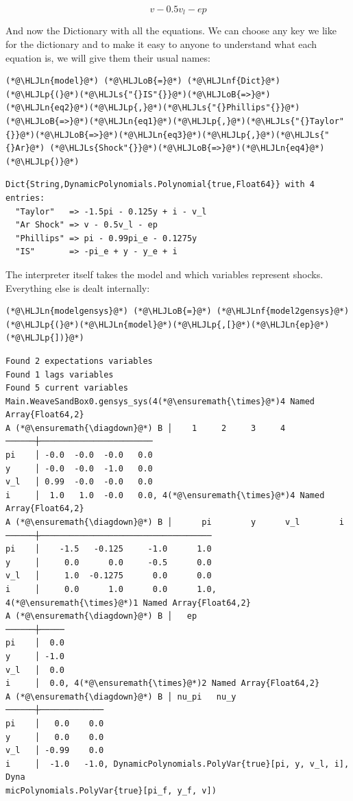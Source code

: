 \documentclass[12pt,a4paper]{article}
\newcommand{\HLJLn}[1]{#1}
\newcommand{\HLJLnf}[1]{\textcolor[RGB]{66,102,213}{#1}}
\newcommand{\HLJLs}[1]{\textcolor[RGB]{201,61,57}{#1}}
\newcommand{\HLJLoB}[1]{\textcolor[RGB]{102,102,102}{\textbf{#1}}}
\newcommand{\HLJLp}[1]{#1}
\begin{document}
$$ v - 0.5v_l - ep $$

And now the Dictionary with all the equations. We can choose any key we like for the dictionary and to make it easy to anyone to understand what each equation is, we will give them their usual names:


\begin{lstlisting}
(*@\HLJLn{model}@*) (*@\HLJLoB{=}@*) (*@\HLJLnf{Dict}@*)(*@\HLJLp{(}@*)(*@\HLJLs{"{}IS"{}}@*)(*@\HLJLoB{=>}@*)(*@\HLJLn{eq2}@*)(*@\HLJLp{,}@*)(*@\HLJLs{"{}Phillips"{}}@*)(*@\HLJLoB{=>}@*)(*@\HLJLn{eq1}@*)(*@\HLJLp{,}@*)(*@\HLJLs{"{}Taylor"{}}@*)(*@\HLJLoB{=>}@*)(*@\HLJLn{eq3}@*)(*@\HLJLp{,}@*)(*@\HLJLs{"{}Ar}@*) (*@\HLJLs{Shock"{}}@*)(*@\HLJLoB{=>}@*)(*@\HLJLn{eq4}@*)(*@\HLJLp{)}@*)
\end{lstlisting}

\begin{lstlisting}
Dict{String,DynamicPolynomials.Polynomial{true,Float64}} with 4 entries:
  "Taylor"   => -1.5pi - 0.125y + i - v_l
  "Ar Shock" => v - 0.5v_l - ep
  "Phillips" => pi - 0.99pi_e - 0.1275y
  "IS"       => -pi_e + y - y_e + i
\end{lstlisting}


The interpreter itself takes the model and which variables represent shocks. Everything else is dealt internally:


\begin{lstlisting}
(*@\HLJLn{modelgensys}@*) (*@\HLJLoB{=}@*) (*@\HLJLnf{model2gensys}@*)(*@\HLJLp{(}@*)(*@\HLJLn{model}@*)(*@\HLJLp{,[}@*)(*@\HLJLn{ep}@*)(*@\HLJLp{])}@*)
\end{lstlisting}

\begin{lstlisting}
Found 2 expectations variables
Found 1 lags variables
Found 5 current variables
Main.WeaveSandBox0.gensys_sys(4(*@\ensuremath{\times}@*)4 Named Array{Float64,2}
A (*@\ensuremath{\diagdown}@*) B │    1     2     3     4
──────┼───────────────────────
pi    │ -0.0  -0.0  -0.0   0.0
y     │ -0.0  -0.0  -1.0   0.0
v_l   │ 0.99  -0.0  -0.0   0.0
i     │  1.0   1.0  -0.0   0.0, 4(*@\ensuremath{\times}@*)4 Named Array{Float64,2}
A (*@\ensuremath{\diagdown}@*) B │      pi        y      v_l        i
──────┼───────────────────────────────────
pi    │    -1.5   -0.125     -1.0      1.0
y     │     0.0      0.0     -0.5      0.0
v_l   │     1.0  -0.1275      0.0      0.0
i     │     0.0      1.0      0.0      1.0, 4(*@\ensuremath{\times}@*)1 Named Array{Float64,2}
A (*@\ensuremath{\diagdown}@*) B │   ep
──────┼─────
pi    │  0.0
y     │ -1.0
v_l   │  0.0
i     │  0.0, 4(*@\ensuremath{\times}@*)2 Named Array{Float64,2}
A (*@\ensuremath{\diagdown}@*) B │ nu_pi   nu_y
──────┼─────────────
pi    │   0.0    0.0
y     │   0.0    0.0
v_l   │ -0.99    0.0
i     │  -1.0   -1.0, DynamicPolynomials.PolyVar{true}[pi, y, v_l, i], Dyna
micPolynomials.PolyVar{true}[pi_f, y_f, v])
\end{lstlisting}
\end{document}
